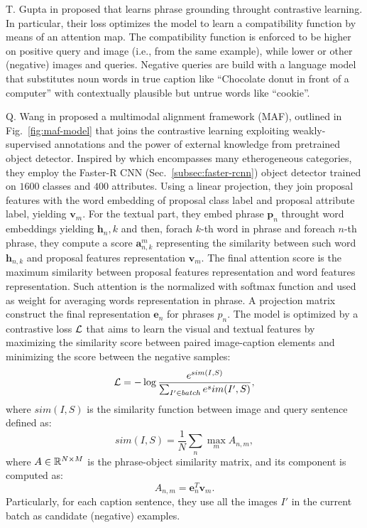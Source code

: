 T. Gupta \etal{} in \cite{gupta2020contrastive} proposed that learns
phrase grounding throught contrastive learning. In particular, their
loss optimizes the model to learn a compatibility function by means of
an attention map. The compatibility function is enforced to be higher
on positive query and image (i.e., from the same example), while lower
or other (negative) images and queries. Negative queries are build
with a language model that substitutes noun words in true caption like
``Chocolate donut in front of a computer'' with contextually plausible
but untrue words like ``cookie''.

Q. Wang \etal{} in \cite{wang2020maf} proposed a multimodal alignment
framework (MAF), outlined in Fig.~\ref{fig:maf-model} that joins the
contrastive learning exploiting weakly-supervised annotations and the
power of external knowledge from pretrained object detector. Inspired
by \cite{wang2019phrase} which encompasses many etherogeneous
categories, they employ the Faster-R CNN
(Sec.~\ref{subsec:faster-rcnn}) object detector trained on $1600$
classes and $400$ attributes. Using a linear projection, they join
proposal features with the word embedding of proposal class label and
proposal attribute label, yielding $\bm{v}_m$. For the textual part,
they embed phrase $\bm{p}_n$ throught word embeddings yielding
$\bm{h}_n,k$ and then, forach $k$-th word in phrase and foreach $n$-th
phrase, they compute a score $\bm{a}^m_{n,k}$ representing the
similarity between such word $\bm{h}_{n,k}$ and proposal features
representation $\bm{v}_m$. The final attention score is the maximum
similarity between proposal features representation and word features
representation. Such attention is the normalized with softmax function
and used as weight for averaging words representation in phrase. A
projection matrix construct the final representation $\bm{e}_n$ for
phrases $p_n$. The model is optimized by a contrastive loss $\mathcal{L}$
that aims to learn the visual and textual features by maximizing the
similarity score between paired image-caption elements and minimizing
the score between the negative samples:
\begin{equation}
  \mathcal{L} = - \log \frac{e^{sim(I, S)}}{ \sum_{I' \in batch} e^sim(I', S) },
\end{equation}
where $sim(I, S)$ is the similarity function between image and query
sentence defined as:
\begin{equation}
  sim(I, S) = \frac{1}{N} \sum_n \max_m A_{n,m},
\end{equation}
where $A \in \mathbb{R}^{N \times M}$ is the phrase-object similarity
matrix, and its component is computed as:
\begin{equation}
  A_{n,m} = \bm{e}^T_n \bm{v}_m.
\end{equation}
Particularly, for each caption sentence, they use all the images $I′$
in the current batch as candidate (negative) examples.

